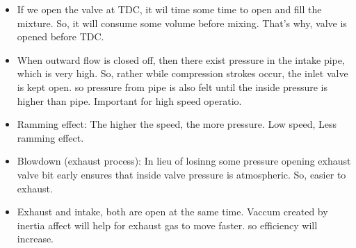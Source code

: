 \documentclass{article}
\begin{document}
\begin{multicols}{2}
\begin{itemize}
    \item If we open the valve at TDC, it wil time some time to open and fill the mixture. So, it will consume some volume before mixing. That's why, valve is opened before TDC. 
    \item When outward flow is closed off, then there exist pressure in the intake pipe, which is very high. So, rather wbile compression strokes occur, the inlet valve is kept open. so pressure from pipe is also felt until the inside pressure is higher than pipe. Important for high speed operatio. 
    \item Ramming effect: The higher the speed, the more pressure. Low speed, Less ramming effect.
    \item Blowdown (exhaust process): In lieu of losinng some pressure opening exhaust valve bit early ensures that inside valve pressure is atmospheric. So, easier to exhaust. 
    \item Exhaust and intake, both are open at the same time. Vaccum created by inertia affect will help for exhaust gas to move faster. so efficiency will increase.

  \end{itemize}
\end{multicols}
\end{document}
